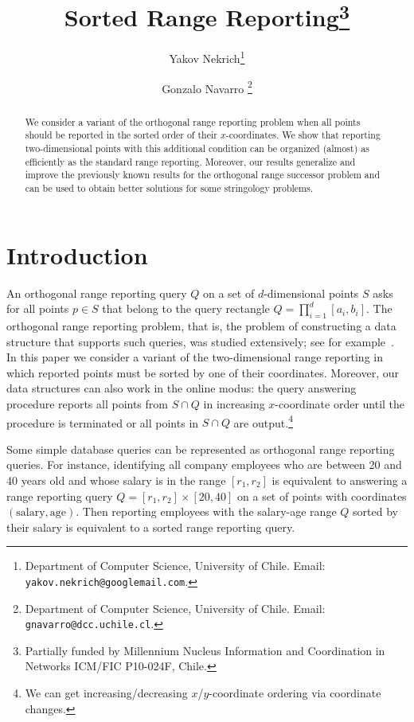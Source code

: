 \documentclass[11pt]{article}
\def\idrm#1{\ensuremath{\mathrm{#1}}}
\begin{document}
\title{Sorted Range Reporting\thanks{Partially funded by Millennium Nucleus Information and Coordination in
Networks ICM/FIC P10-024F, Chile.} }
\author
{
Yakov Nekrich\thanks{Department of Computer Science, University of Chile.
Email: {\tt yakov.nekrich@googlemail.com}.}
\and 
Gonzalo Navarro \thanks{Department of Computer Science, University of Chile.
Email: {\tt  gnavarro@dcc.uchile.cl}.}
}


\date{}
\maketitle
\begin{abstract}
We consider a variant of the orthogonal range reporting problem
when all points should be reported in the sorted order of their
 $x$-coordinates. We show that reporting two-dimensional points with this
 additional condition can be organized  
(almost) as efficiently as the standard range reporting.
Moreover, our results generalize and improve the previously known results 
 for the orthogonal range successor problem and can be used to obtain better 
solutions for some stringology problems. 
\end{abstract}

\section{Introduction}
\label{sec:introduction}
An orthogonal range reporting query $Q$ on a set of $d$-dimensional points 
$S$ asks for all points $p\in S$ that belong to the query 
rectangle $Q=\prod_{i=1}^d[a_i,b_i]$.  
The orthogonal range reporting problem, that is, the problem of constructing 
a data structure that supports such queries, was studied extensively; see
for example~\cite{agarwal1999geometric}.  
In this paper we consider  a variant of the two-dimensional range reporting  in which reported points must be sorted by one of their coordinates.  
Moreover, our data structures can also work in the online modus: the query answering procedure reports all points from $S\cap Q$ in 
 increasing $x$-coordinate order
until the procedure is terminated or all points in $S\cap Q$ are output.\footnote{We can get increasing/decreasing 
$x$/$y$-coordinate ordering via coordinate changes.}

Some simple database queries can be represented as orthogonal range reporting 
queries. For instance, identifying all company employees who are between 
20 and 40 years old and whose salary is in the range $[r_1,r_2]$ is equivalent 
to answering a range reporting query $Q= [r_1,r_2]\times [20,40]$ on a set of 
points with coordinates $(\idrm{salary}, \idrm{age})$. 
Then reporting employees with the salary-age range $Q$
sorted by their salary is equivalent to 
a sorted range reporting query. 
\end{document}
